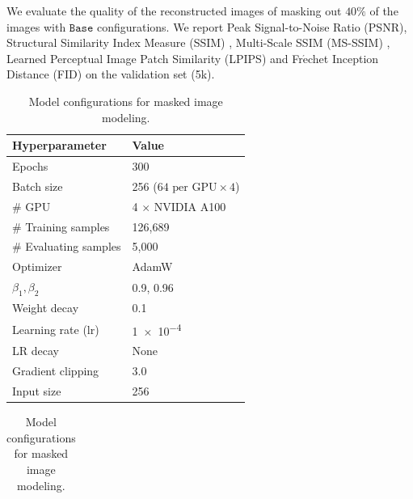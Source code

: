 We evaluate the quality of the reconstructed images of masking out $40\%$ of the images with $\texttt{Base}$ configurations. We report Peak Signal-to-Noise Ratio (PSNR), Structural Similarity Index Measure (SSIM) \citep{wang2004image}, Multi-Scale SSIM (MS-SSIM) \citep{wang2003multiscale}, Learned Perceptual Image Patch Similarity (LPIPS) \citep{zhang2018unreasonable} and Fr$\acute{\text{e}}$chet Inception Distance (FID) \citep{heusel2017gans} on the validation set (5k). 
\begin{table}[htbp]
    \centering
    \begin{minipage}[t]{0.49\textwidth}
    \caption{Training recipe for masked image modeling.}
    \label{tab:training recipe for masked image modeling}
        \centering
        \begin{tabular}{ll}
            \toprule
            \textbf{Hyperparameter}  & \textbf{Value} \\
            \midrule
            Epochs  &  300 \\
            Batch size & 256 ($64 \text{ per GPU} \times 4$)\\
            $\#$ GPU & 4 $\times$ NVIDIA A100 \\
            $\#$ Training samples & 126{,}689 \\
            $\#$ Evaluating samples & 5{,}000 \\
            Optimizer & AdamW \\
            $\beta_1, \beta_2$ & 0.9, 0.96 \\
            Weight decay & 0.1  \\
            Learning rate (lr) & \num{1e-4}\\
            LR decay & None \\
            Gradient clipping & 3.0 \\
            Input size & 256 \\
            \bottomrule
        \end{tabular}
    \end{minipage}%
    \hfill
    \begin{minipage}[t]{0.49\textwidth}
        \caption{Model configurations for masked image modeling.}
    \label{tab:model configuration for masked image modeling}
        \centering
        \begin{tabular}{ll}

\end{tabular}
\end{minipage}
\end{table}
